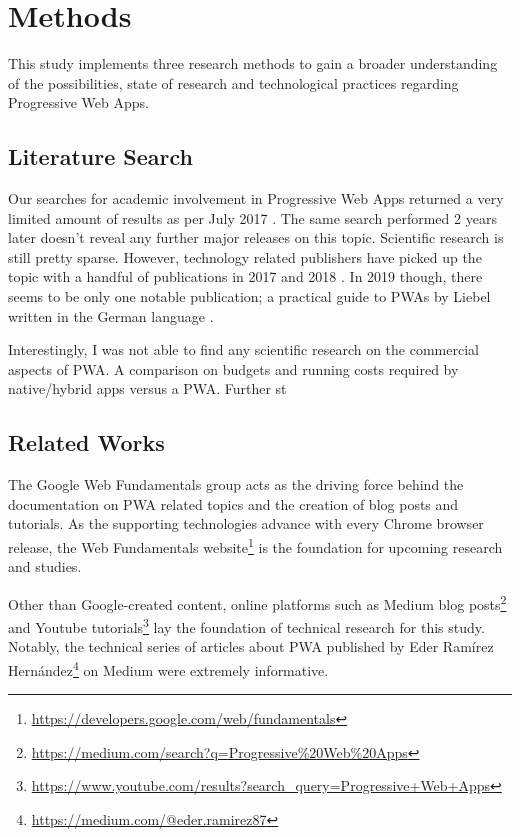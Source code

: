 \chapter{Methods}

This study implements three research methods to gain a broader understanding of the possibilities, state of research and technological practices regarding Progressive Web Apps.

\section{Literature Search}

Our searches for academic involvement in Progressive Web Apps returned a very limited amount of results as per July 2017 \citep{biorn-hansenProgressiveWebApps2018}. The same search performed 2 years later doesn't reveal any further major releases on this topic. Scientific research is still pretty sparse. However, technology related publishers have picked up the topic with a handful of publications in 2017 and 2018 \citep{humeProgressiveWebApps2018,aterBuildingProgressiveWeb2017}. In 2019 though, there seems to be only one notable publication; a practical guide to PWAs by Liebel written in the German language \citep{liebelProgressiveWebApps2019}.

Interestingly, I was not able to find any scientific research on the commercial aspects of PWA. A comparison on budgets and running costs required by native/hybrid apps versus a PWA. Further st

\section{Related Works}
The Google Web Fundamentals group acts as the driving force behind the documentation on PWA related topics and the creation of blog posts and tutorials. As the supporting technologies advance with every Chrome browser release, the Web Fundamentals website\footnote{\url{https://developers.google.com/web/fundamentals}} is the foundation for upcoming research and studies.

Other than Google-created content, online platforms such as Medium blog posts\footnote{\url{https://medium.com/search?q=Progressive\%20Web\%20Apps}} and Youtube tutorials\footnote{\url{https://www.youtube.com/results?search_query=Progressive+Web+Apps}} lay the foundation of technical research for this study. Notably, the technical series of articles about PWA published by Eder Ramírez Hernández\footnote{\url{https://medium.com/@eder.ramirez87}} on Medium were extremely informative.


